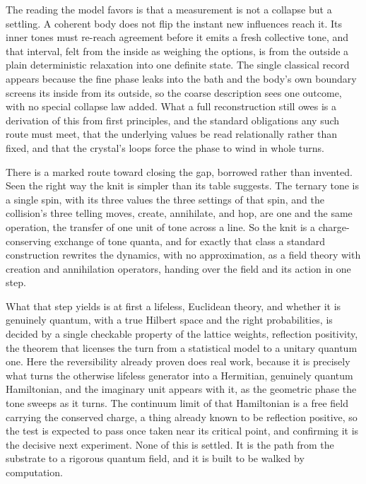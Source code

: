 The reading the model favors is that a measurement is not a collapse but a settling. A coherent body does not flip the instant new influences reach it. Its inner tones must re-reach agreement before it emits a fresh collective tone, and that interval, felt from the inside as weighing the options, is from the outside a plain deterministic relaxation into one definite state. The single classical record appears because the fine phase leaks into the bath and the body's own boundary screens its inside from its outside, so the coarse description sees one outcome, with no special collapse law added. What a full reconstruction still owes is a derivation of this from first principles, and the standard obligations any such route must meet, that the underlying values be read relationally rather than fixed, and that the crystal's loops force the phase to wind in whole turns.

There is a marked route toward closing the gap, borrowed rather than invented. Seen the right way the knit is simpler than its table suggests. The ternary tone is a single spin, with its three values the three settings of that spin, and the collision's three telling moves, create, annihilate, and hop, are one and the same operation, the transfer of one unit of tone across a line. So the knit is a charge-conserving exchange of tone quanta, and for exactly that class a standard construction rewrites the dynamics, with no approximation, as a field theory with creation and annihilation operators, handing over the field and its action in one step.

What that step yields is at first a lifeless, Euclidean theory, and whether it is genuinely quantum, with a true Hilbert space and the right probabilities, is decided by a single checkable property of the lattice weights, reflection positivity, the theorem that licenses the turn from a statistical model to a unitary quantum one. Here the reversibility already proven does real work, because it is precisely what turns the otherwise lifeless generator into a Hermitian, genuinely quantum Hamiltonian, and the imaginary unit appears with it, as the geometric phase the tone sweeps as it turns. The continuum limit of that Hamiltonian is a free field carrying the conserved charge, a thing already known to be reflection positive, so the test is expected to pass once taken near its critical point, and confirming it is the decisive next experiment. None of this is settled. It is the path from the substrate to a rigorous quantum field, and it is built to be walked by computation.

